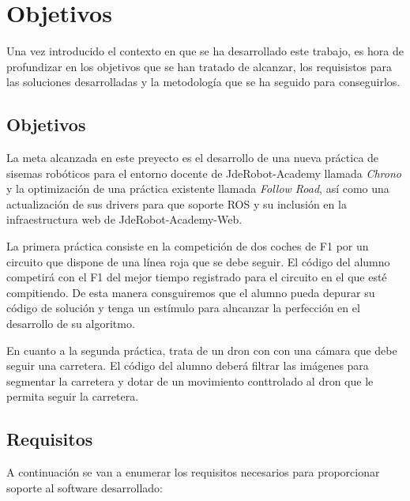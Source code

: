\chapter{Objetivos}\label{cap.objetivos}
Una vez introducido el contexto en que se ha desarrollado este trabajo, es hora de profundizar en los objetivos que se han tratado de alcanzar, los requisistos para las soluciones desarrolladas y la metodología que se ha seguido para conseguirlos.

\section{Objetivos}
La meta alcanzada en este preyecto es el desarrollo de una nueva práctica de sisemas robóticos para el entorno docente de JdeRobot-Academy llamada \textit{Chrono} y la optimización de una práctica existente llamada \textit{Follow Road}, así como una actualización de sus drivers para que soporte ROS y su inclusión en la infraestructura web de JdeRobot-Academy-Web.

La primera práctica consiste en la competición de dos coches de F1 por un circuito que dispone de una línea roja que se debe seguir. El código del alumno competirá con el F1 del mejor tiempo registrado para el circuito en el que esté compitiendo. De esta manera consguiremos que el alumno pueda depurar su código de solución y tenga un estímulo para alncanzar la perfección en el desarrollo de su algoritmo.

En cuanto a la segunda práctica, trata de un dron con con una cámara que debe seguir una carretera. El código del alumno deberá filtrar las imágenes para segmentar la carretera y dotar de un movimiento conttrolado al dron que le permita seguir la carretera.

\section{Requisitos}
A continuación se van a enumerar los requisitos necesarios para proporcionar soporte al software desarrollado:

